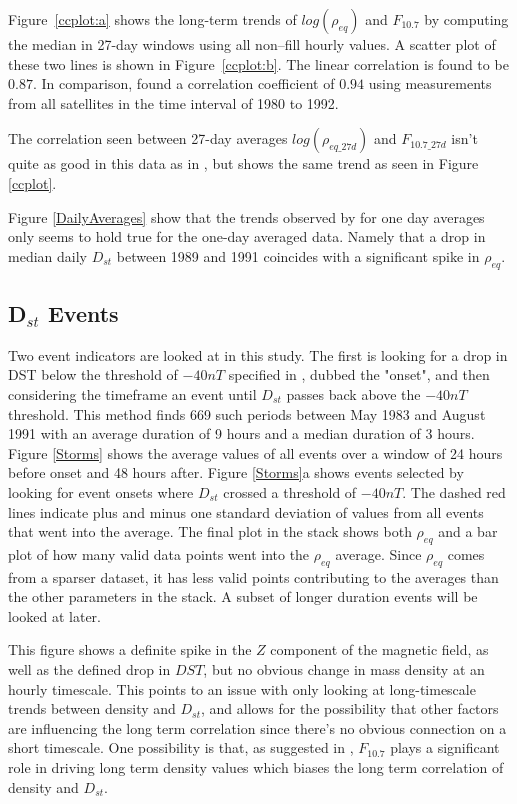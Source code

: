 \documentclass[10pt,twocolumn]{article}
\begin{document}
Figure~\ref{ccplot:a} shows the long-term trends of $log(\rho_{eq})$ and $F_{10.7}$ by computing the median in 27-day windows using all non--fill hourly values.  A scatter plot of these two lines is shown in Figure~\ref{ccplot:b}.  The linear correlation is found to be $0.87$.  In comparison, \cite{Takahashi2010} found a correlation coefficient of $0.94$ using measurements from all satellites in the time interval of 1980 to 1992.

The correlation seen between 27-day averages $log(\rho_{eq\_27d})$ and $F_{10.7\_27d}$ isn't quite as good in this data as in \cite{Takahashi2010}, but shows the same trend as seen in Figure \ref{ccplot}.

Figure \ref{DailyAverages} show that the trends observed by \cite{Takahashi2010} for one day averages only seems to hold true for the one-day averaged data. Namely that a drop in median daily $D_{st}$ between 1989 and 1991 coincides with a significant spike in $\rho_{eq}$. 

\subsection{D$_{st}$ Events}
Two event indicators are looked at in this study. The first is looking for a drop in DST below the threshold of $-40nT$ specified in \cite{Takahashi2010}, dubbed the "onset", and then considering the timeframe an event until $D_{st}$ passes back above the $-40nT$ threshold. This method finds 669 such periods between May 1983 and August 1991 with an average duration of 9 hours and a median duration of 3 hours. Figure \ref{Storms} shows the average values of all events over a window of 24 hours before onset and 48 hours after. Figure \ref{Storms}a shows events selected by looking for event onsets where $D_{st}$ crossed a threshold of $-40nT$. The dashed red lines indicate plus and minus one standard deviation of values from all events that went into the average. The final plot in the stack shows both $\rho_{eq}$ and a bar plot of how many valid data points went into the $\rho_{eq}$ average. Since $\rho_{eq}$ comes from a sparser dataset, it has less valid points contributing to the averages than the other parameters in the stack. A subset of longer duration events will be looked at later. 

This figure shows a definite spike in the $Z$ component of the magnetic field, as well as the defined drop in $DST$, but no obvious change in mass density at an hourly timescale. This points to an issue with only looking at long-timescale trends between density and $D_{st}$, and allows for the possibility that other factors are influencing the long term correlation since there's no obvious connection on a short timescale. One possibility is that, as suggested in \cite{Takahashi2010}, $F_{10.7}$ plays a significant role in driving long term density values which biases the long term correlation of density and $D_{st}$.
\end{document}
